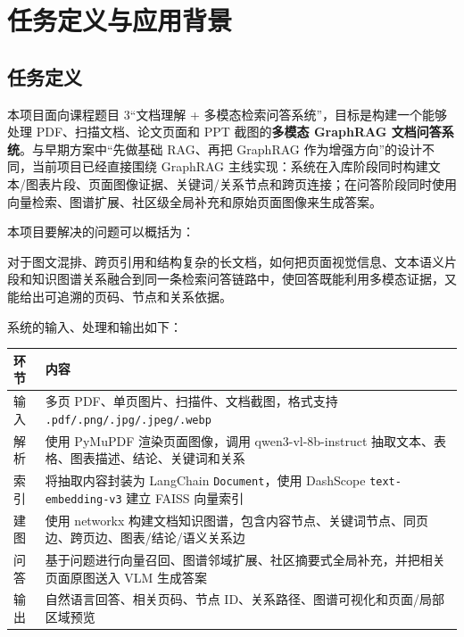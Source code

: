 \chapter{任务定义与应用背景}\label{ux4e00ux4efbux52a1ux5b9aux4e49ux4e0eux5e94ux7528ux80ccux666f}

\section{任务定义}\label{ux4efbux52a1ux5b9aux4e49}

本项目面向课程题目 3``文档理解 +
多模态检索问答系统''，目标是构建一个能够处理 PDF、扫描文档、论文页面和
PPT 截图的\textbf{多模态 GraphRAG 文档问答系统}。与早期方案中``先做基础
RAG、再把 GraphRAG 作为增强方向''的设计不同，当前项目已经直接围绕
GraphRAG
主线实现：系统在入库阶段同时构建文本/图表片段、页面图像证据、关键词/关系节点和跨页连接；在问答阶段同时使用向量检索、图谱扩展、社区级全局补充和原始页面图像来生成答案。

本项目要解决的问题可以概括为：

对于图文混排、跨页引用和结构复杂的长文档，如何把页面视觉信息、文本语义片段和知识图谱关系融合到同一条检索问答链路中，使回答既能利用多模态证据，又能给出可追溯的页码、节点和关系依据。

系统的输入、处理和输出如下：

\begin{longtable}[]{@{}
  >{\raggedright\arraybackslash}p{}
  >{\raggedright\arraybackslash}p{}@{}}
\toprule\noalign{}
\begin{minipage}[b]{\linewidth}\raggedright
环节
\end{minipage} & \begin{minipage}[b]{\linewidth}\raggedright
内容
\end{minipage} \\
\midrule\noalign{}
\endhead
\bottomrule\noalign{}
\endlastfoot
输入 & 多页 PDF、单页图片、扫描件、文档截图，格式支持
\texttt{.pdf/.png/.jpg/.jpeg/.webp} \\
解析 & 使用 PyMuPDF 渲染页面图像，调用 qwen3-vl-8b-instruct
抽取文本、表格、图表描述、结论、关键词和关系 \\
索引 & 将抽取内容封装为 LangChain \texttt{Document}，使用 DashScope
\texttt{text-embedding-v3} 建立 FAISS 向量索引 \\
建图 & 使用 networkx
构建文档知识图谱，包含内容节点、关键词节点、同页边、跨页边、图表/结论/语义关系边 \\
问答 &
基于问题进行向量召回、图谱邻域扩展、社区摘要式全局补充，并把相关页面原图送入
VLM 生成答案 \\
输出 & 自然语言回答、相关页码、节点
ID、关系路径、图谱可视化和页面/局部区域预览 \\
\end{longtable}

